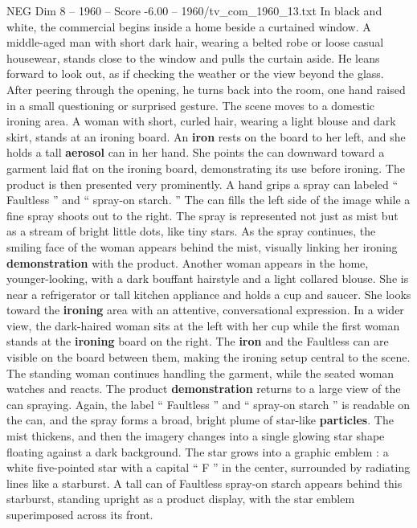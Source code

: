 \begin{textsample}{NEG Dim 8 – 1960 – Score -6.00 – 1960/tv\_com\_1960\_13.txt}  \label{ex:f8_neg_001}
In black and white, the commercial begins inside a home beside a curtained window.
A middle-aged man with short dark hair, wearing a belted robe or loose casual housewear, stands close to the window and pulls the curtain aside.
He leans forward to look out, as if checking the weather or the view beyond the glass.
After peering through the opening, he turns back into the room, one hand raised in a small questioning or surprised gesture.
The scene moves to a domestic ironing area.
A woman with short, curled hair, wearing a light blouse and dark skirt, stands at an ironing board.
An \textbf{iron} rests on the board to her left, and she holds a tall \textbf{aerosol} can in her hand.
She points the can downward toward a garment laid flat on the ironing board, demonstrating its use before ironing.
The product is then presented very prominently.
A hand grips a spray can labeled “ Faultless ” and “ spray-on starch. ” The can fills the left side of the image while a fine spray shoots out to the right.
The spray is represented not just as mist but as a stream of bright little dots, like tiny stars.
As the spray continues, the smiling face of the woman appears behind the mist, visually linking her ironing \textbf{demonstration} with the product.
Another woman appears in the home, younger-looking, with a dark bouffant hairstyle and a light collared blouse.
She is near a refrigerator or tall kitchen appliance and holds a cup and saucer.
She looks toward the \textbf{ironing} area with an attentive, conversational expression.
In a wider view, the dark-haired woman sits at the left with her cup while the first woman stands at the \textbf{ironing} board on the right.
The \textbf{iron} and the Faultless can are visible on the board between them, making the ironing setup central to the scene.
The standing woman continues handling the garment, while the seated woman watches and reacts.
The product \textbf{demonstration} returns to a large view of the can spraying.
Again, the label “ Faultless ” and “ spray-on starch ” is readable on the can, and the spray forms a broad, bright plume of star-like \textbf{particles}.
The mist thickens, and then the imagery changes into a single glowing star shape floating against a dark background.
The star grows into a graphic emblem : a white five-pointed star with a capital “ F ” in the center, surrounded by radiating lines like a starburst.
A tall can of Faultless spray-on starch appears behind this starburst, standing upright as a product display, with the star emblem superimposed across its front.

\end{textsample}
